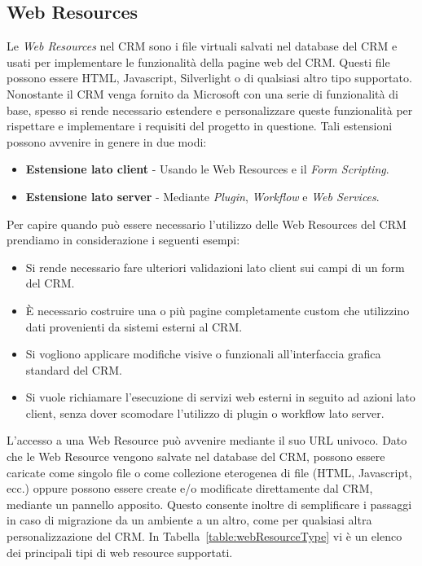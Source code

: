 \subsection{Web Resources}
 Le \textit{Web Resources} nel CRM sono i file virtuali salvati nel database del CRM e usati per implementare le funzionalità della pagine web del CRM. Questi file possono essere HTML, Javascript, Silverlight o di qualsiasi altro tipo supportato. 
 Nonostante il CRM venga fornito da Microsoft con una serie di funzionalità di base, spesso si rende necessario estendere e personalizzare queste funzionalità per rispettare e implementare i requisiti del progetto in questione. Tali estensioni possono avvenire in genere in due modi:
 \begin{itemize}
   \item \textbf{Estensione lato client} - Usando le Web Resources e il \textit{Form Scripting}.
   \item \textbf{Estensione lato server} - Mediante \textit{Plugin}, \textit{Workflow} e \textit{Web Services}.
 \end{itemize}

Per capire quando può essere necessario l'utilizzo delle Web Resources del CRM prendiamo in considerazione i seguenti esempi: 
\begin{itemize}
  \item Si rende necessario fare ulteriori validazioni lato client sui campi di un form del CRM.
  \item È necessario costruire una o più pagine completamente custom che utilizzino dati provenienti da sistemi esterni al CRM.
  \item Si vogliono applicare modifiche visive o funzionali all'interfaccia grafica standard del CRM.
  \item Si vuole richiamare l'esecuzione di servizi web esterni in seguito ad azioni lato client, senza dover scomodare l'utilizzo di plugin o workflow lato server.
\end{itemize}

L'accesso a una Web Resource può avvenire mediante il suo URL univoco. Dato che le Web Resource vengono salvate nel database del CRM, possono essere caricate come singolo file o come collezione eterogenea di file (HTML, Javascript, ecc.) oppure possono essere create e/o modificate direttamente dal CRM, mediante un pannello apposito. Questo consente inoltre di semplificare i passaggi in caso di migrazione da un ambiente a un altro, come per qualsiasi altra personalizzazione del CRM. In Tabella~\ref{table:webResourceType} vi è un elenco dei principali tipi di web resource supportati.~\cite{DynamicsTutorialspoint}

